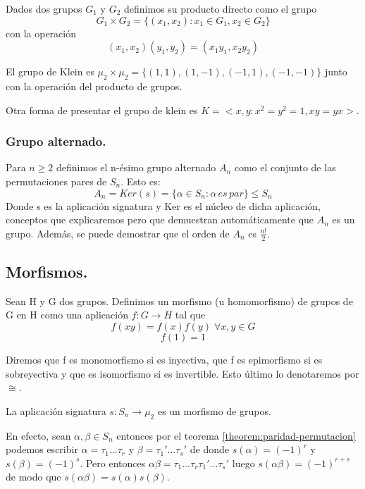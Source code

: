 \begin{ndef}
Dados dos grupos $G_1$ y $G_2$ definimos su producto directo como el grupo $$G_1 \times G_2 = \{(x_1,x_2):x_1 \in G_1,x_2 \in G_2\}$$ con la operación $$(x_1,x_2)(y_1,y_2) = (x_1y_1,x_2y_2)$$
\end{ndef}

El grupo de Klein es $\mu_2 \times \mu_2 = \{(1,1),(1,-1),(-1,1),(-1,-1)\}$ junto con la operación del producto de grupos.

Otra forma de presentar el grupo de klein es $K = <x,y : x^2 = y^2 = 1, xy = yx>$.

\subsubsection{Grupo alternado.}

Para $n \ge 2$ definimos el n-ésimo grupo alternado $A_n$ como el conjunto de las permutaciones pares de $S_n$. Esto es: $$A_n = Ker(s) = \{\alpha \in S_n : \alpha \, es \, par\} \le S_n$$ Donde s es la aplicación signatura y Ker es el núcleo de dicha aplicación, conceptos que explicaremos pero que demuestran automáticamente que $A_n$ es un grupo. Además, se puede demostrar que el orden de $A_n$ es $\frac{n!}{2}$.

\subsection{Morfismos.}

\begin{ndef}
Sean H y G dos grupos. Definimos un morfismo (u homomorfismo) de grupos de G en H como una aplicación $f:G \rightarrow H$ tal que $$f(xy) = f(x)f(y) \; \forall x,y \in G$$
$$ f(1) = 1$$

Diremos que f es monomorfismo si es inyectiva, que f es epimorfismo si es sobreyectiva y que es isomorfismo si es invertible. Esto último lo denotaremos por $\cong$.
\end{ndef}

\begin{ejemplo}
La aplicación signatura $s:S_n \rightarrow \mu_2$ es un morfismo de grupos.

En efecto, sean $\alpha,\beta \in S_n$ entonces por el teorema \ref{theorem:paridad-permutacion} podemos escribir $\alpha = \tau_1...\tau_r$ y $\beta = \tau_1'...\tau_s'$ de donde $s(\alpha) = (-1)^r$ y $s(\beta) = (-1)^s$. Pero entonces $\alpha\beta = \tau_1...\tau_r\tau_1'...\tau_s'$ luego $s(\alpha\beta) = (-1)^{r+s}$ de modo que $s(\alpha\beta) = s(\alpha)s(\beta)$.
\end{ejemplo}

